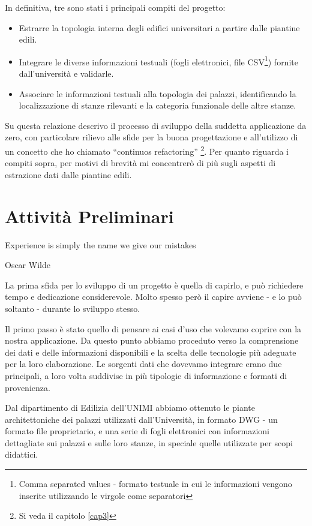 \documentclass[12pt]{report}
\begin{document}
In definitiva, tre sono stati i principali compiti del progetto:
\begin{itemize}
  \item Estrarre la topologia interna degli edifici universitari a partire dalle piantine edili.
  \item Integrare le diverse informazioni testuali (fogli elettronici, file CSV\footnote{Comma separated values - formato testuale in cui le informazioni vengono inserite utilizzando le virgole come separatori}) fornite dall'università e validarle.
  \item Associare le informazioni testuali alla topologia dei palazzi, identificando la localizzazione di stanze rilevanti e la categoria funzionale delle altre stanze.
\end{itemize}

Su questa relazione descrivo il processo di sviluppo della suddetta applicazione da zero, con particolare rilievo alle sfide per la buona progettazione e all'utilizzo di un concetto che ho chiamato “continuos refactoring” \footnote{Si veda il capitolo \ref{cap3}}. Per quanto riguarda i compiti sopra, per motivi di brevità mi concentrerò di più sugli aspetti di estrazione dati dalle piantine edili.

% 
% 
\chapter{Attività Preliminari}
\label{cap2}

\epigraph{Experience is simply the name we give our mistakes}{Oscar Wilde}



La prima sfida per lo sviluppo di un progetto è quella di capirlo, e può richiedere tempo e dedicazione considerevole. Molto spesso però il capire avviene - e lo può soltanto - durante lo sviluppo stesso.

Il primo passo è stato quello di pensare ai casi d'uso che volevamo coprire con la nostra applicazione. Da questo punto abbiamo proceduto verso la comprensione dei dati e delle informazioni disponibili e la scelta delle tecnologie più adeguate per la loro elaborazione. Le sorgenti dati che dovevamo integrare erano due principali, a loro volta suddivise in più tipologie di informazione e formati di provenienza.

Dal dipartimento di Edilizia dell'UNIMI abbiamo ottenuto le piante architettoniche dei palazzi utilizzati dall'Università, in formato DWG - un formato file proprietario, e una serie di fogli elettronici con informazioni dettagliate sui palazzi e sulle loro stanze, in speciale quelle utilizzate per scopi didattici.
\end{document}

